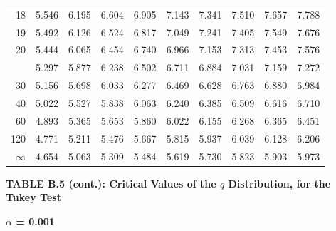 \documentclass[10pt]{article}
\begin{document}
\begin{longtable}{@{}r!{\vrule width 0.8pt\hspace{0.55em}}rrrrrrrrr@{}}
18 & 5.546 & 6.195 & 6.604 & 6.905 & 7.143 & 7.341 & 7.510 & 7.657 & 7.788 \\
19 & 5.492 & 6.126 & 6.524 & 6.817 & 7.049 & 7.241 & 7.405 & 7.549 & 7.676 \\
20 & 5.444 & 6.065 & 6.454 & 6.740 & 6.966 & 7.153 & 7.313 & 7.453 & 7.576 \\
 & 5.297 & 5.877 & 6.238 & 6.502 & 6.711 & 6.884 & 7.031 & 7.159 & 7.272 \\
30 & 5.156 & 5.698 & 6.033 & 6.277 & 6.469 & 6.628 & 6.763 & 6.880 & 6.984 \\
40 & 5.022 & 5.527 & 5.838 & 6.063 & 6.240 & 6.385 & 6.509 & 6.616 & 6.710 \\
60 & 4.893 & 5.365 & 5.653 & 5.860 & 6.022 & 6.155 & 6.268 & 6.365 & 6.451 \\
120 & 4.771 & 5.211 & 5.476 & 5.667 & 5.815 & 5.937 & 6.039 & 6.128 & 6.206 \\
\addlinespace[0.30em]
$\infty$ & 4.654 & 5.063 & 5.309 & 5.484 & 5.619 & 5.730 & 5.823 & 5.903 & 5.973 \\
\end{longtable}
\newpage
\thispagestyle{empty}
\begin{center}
{\large\bfseries TABLE B.5 (cont.): Critical Values of the $q$ Distribution, for the Tukey Test\par}
\end{center}
{\large\bfseries $\alpha$ = 0.001\par}
\vspace{0.45em}
\small
\end{document}
